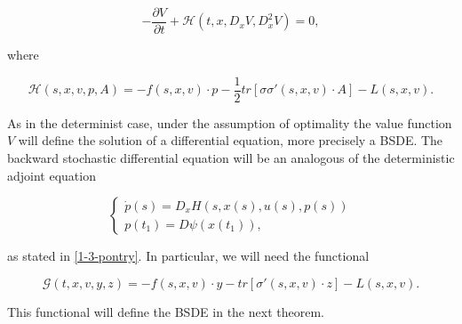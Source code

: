\begin{equation}
    -\frac{\partial V}{\partial t} + \mathcal{H}(t,x,D_xV,D_x^2V) = 0,
\end{equation}

where

\begin{equation}
    \mathcal{H}(s,x,v,p,A) = - f(s,x,v)\cdot p - \frac{1}{2}tr\left[\sigma\sigma'(s,x,v)\cdot A\right] - L(s,x,v).
\end{equation}

As in the determinist case, under the assumption of optimality the value function $V$ will define the solution 
of a differential equation, more precisely a BSDE. The backward stochastic differential equation will be an 
analogous of the deterministic adjoint equation

\[\begin{cases}
    \dot{p}(s) = D_xH(s,x(s),u(s),p(s)) \\
    p(t_1) = D\psi(x(t_1)),
\end{cases}\]

as stated in \eqref{1-3-pontry}. In particular, we will need the functional

\begin{equation}\label{3-2-defG}\mathcal{G}(t,x,v,y,z) = -f(s,x,v)\cdot y - tr\left[\sigma'(s,x,v)\cdot z\right] - L(s,x,v).\end{equation}

This functional will define the BSDE in the next theorem.

